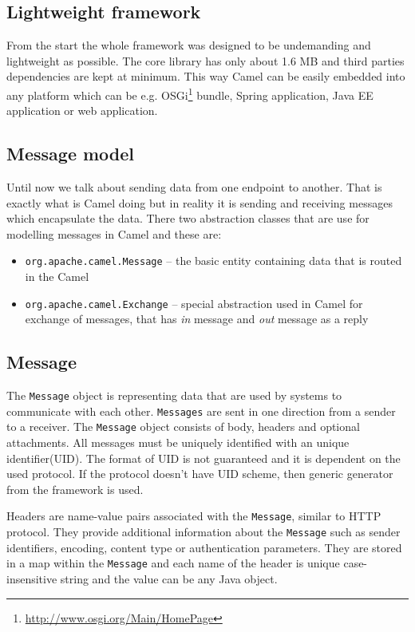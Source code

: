 \documentclass[12pt,final,oneside]{fithesis2}
\begin{document}
\subsection*{Lightweight framework}
From the start the whole framework was designed to be undemanding and lightweight as possible. The core library has only about 1.6 MB and third parties dependencies are kept at minimum. This way Camel can be easily embedded into any platform which can be e.g. OSGi\footnote{\url{http://www.osgi.org/Main/HomePage}} bundle, Spring application, Java EE application or web application. 

\subsection{Message model}
Until now we talk about sending data from one endpoint to another. That is exactly what is Camel doing but in reality it is sending and receiving messages which encapsulate the data. There two abstraction classes that are use for modelling messages in Camel and these are:
\begin{itemize}
\item
\texttt{org.apache.camel.Message} -- the basic entity containing data that is routed in the Camel 

\item
\texttt{org.apache.camel.Exchange} -- special abstraction used in Camel for exchange of messages, that has \textit{in} message and \textit{out} message as a reply

\end{itemize} 

\subsection*{Message}
The \texttt{Message} object is representing data that are used by systems to communicate with each other. \texttt{Messages} are sent in one direction from a sender to a receiver. The \texttt{Message} object consists of body, headers and optional attachments. All messages must be uniquely identified with an unique identifier(UID). The format of UID is not guaranteed and it is dependent on the used protocol. If the protocol doesn't have UID scheme, then generic generator from the framework is used.

Headers are name-value pairs associated with the \texttt{Message}, similar to HTTP protocol. They provide additional information about the \texttt{Message} such as sender identifiers, encoding, content type or authentication parameters. They are stored in a map within the \texttt{Message} and each name of the header is unique case-insensitive string and the value can be any Java object.
\end{document}
